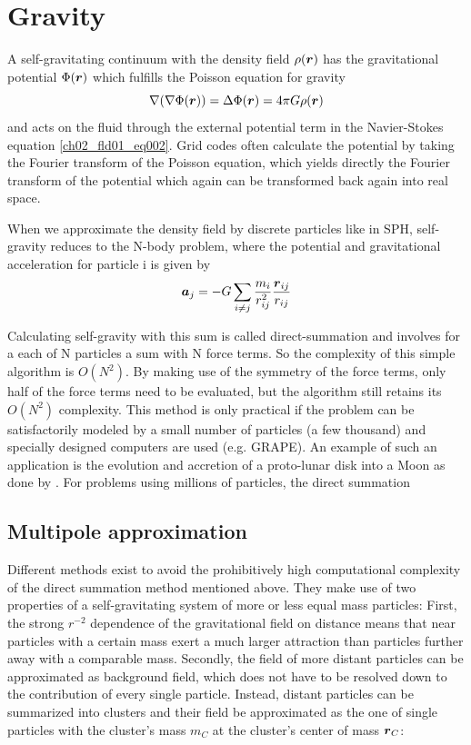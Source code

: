 \section{Gravity}
A self-gravitating continuum with the density field $\rho(\boldsymbol{r})$ has the gravitational potential $\Phi(\boldsymbol{r})$ which fulfills the Poisson equation for gravity
\begin{equation}
\label{ch02_sph01_eq038}
\nabla ( \nabla \Phi(\boldsymbol{r}) ) = \Delta \Phi(\boldsymbol{r}) = 4 \pi G \rho(\boldsymbol{r})
\end{equation}
and acts on the fluid through the external potential term in the Navier-Stokes equation \ref{ch02_fld01_eq002}. Grid codes often calculate the potential by taking the Fourier transform of the Poisson equation, which yields directly the Fourier transform of the potential which again can be transformed back again into real space.

When we approximate the density field by discrete particles like in SPH, self-gravity reduces to the N-body problem, where the potential and gravitational acceleration for particle i is given by
\begin{equation}
\label{ch02_sph01_eq038}
\boldsymbol{a}_j = - G \sum_{i \ne j} \frac{m_i}{r_{ij}^2} \frac{\boldsymbol{r}_{ij}}{r_{ij}} 
\end{equation}

Calculating self-gravity with this sum is called direct-summation and involves for a each of N particles a sum with N force terms. So the complexity of this simple algorithm is $O(N^2)$. By making use of the symmetry of the force terms, only half of the force terms need to be evaluated, but the algorithm still retains its $O(N^2)$ complexity. This method is only practical if the problem can be satisfactorily modeled by a small number of particles (a few thousand) and specially designed computers are used (e.g. GRAPE). An example of such an application is the evolution and accretion of a proto-lunar disk into a Moon as done by \cite{Kokubo:2000p2195}. For problems using millions of particles, the direct summation 

\subsection{Multipole approximation}
Different methods exist to avoid the prohibitively high computational complexity of the direct summation method mentioned above.  They make use of two properties of a self-gravitating system of more or less equal mass particles: First, the strong $r^{-2}$ dependence of the gravitational field on distance means that near particles with a certain mass exert a much larger attraction than particles further away with a comparable mass. Secondly, the field of more distant particles can be approximated as background field, which does not have to be resolved down to the contribution of every single particle. Instead, distant particles can be summarized into clusters and their field be approximated as the one of single particles with the cluster's mass $m_C$ at the cluster's center of mass $\boldsymbol{r}_C$:

